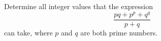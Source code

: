 Determine all integer values that the expression
$$\frac{pq+p^p+q^q}{p+q}$$
can take, where $p$ and $q$ are both prime numbers.
